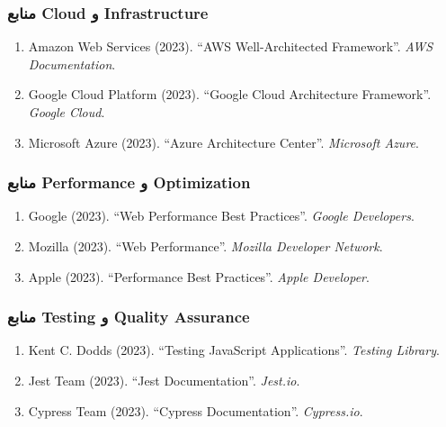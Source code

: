 \documentclass[
]{article}
\begin{document}
\subsubsection{منابع Cloud و
Infrastructure}\label{ux645ux646ux627ux628ux639-cloud-ux648-infrastructure}

\begin{enumerate}
\def\labelenumi{\arabic{enumi}.}
\setcounter{enumi}{45}
\item
  Amazon Web Services (2023). ``AWS Well-Architected Framework''.
  \emph{AWS Documentation}.
\item
  Google Cloud Platform (2023). ``Google Cloud Architecture Framework''.
  \emph{Google Cloud}.
\item
  Microsoft Azure (2023). ``Azure Architecture Center''. \emph{Microsoft
  Azure}.
\end{enumerate}

\subsubsection{منابع Performance و
Optimization}\label{ux645ux646ux627ux628ux639-performance-ux648-optimization}

\begin{enumerate}
\def\labelenumi{\arabic{enumi}.}
\setcounter{enumi}{48}
\item
  Google (2023). ``Web Performance Best Practices''. \emph{Google
  Developers}.
\item
  Mozilla (2023). ``Web Performance''. \emph{Mozilla Developer Network}.
\item
  Apple (2023). ``Performance Best Practices''. \emph{Apple Developer}.
\end{enumerate}

\subsubsection{منابع Testing و Quality
Assurance}\label{ux645ux646ux627ux628ux639-testing-ux648-quality-assurance}

\begin{enumerate}
\def\labelenumi{\arabic{enumi}.}
\setcounter{enumi}{51}
\item
  Kent C. Dodds (2023). ``Testing JavaScript Applications''.
  \emph{Testing Library}.
\item
  Jest Team (2023). ``Jest Documentation''. \emph{Jest.io}.
\item
  Cypress Team (2023). ``Cypress Documentation''. \emph{Cypress.io}.
\end{enumerate}
\end{document}
